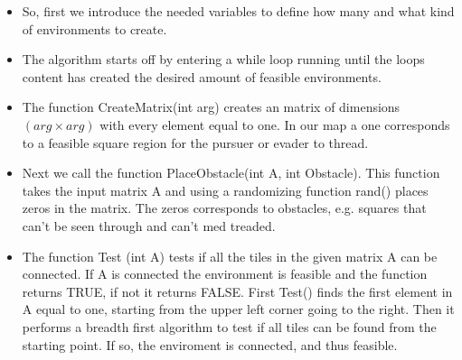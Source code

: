 \begin{itemize}
\item So, first we introduce the needed variables to define how many and what kind of environments to create. 
\item The algorithm starts off by entering a while loop running until the loops content has created the desired amount of feasible environments. 
\item The function CreateMatrix(int arg) creates an matrix of dimensions $(arg \times arg)$ with every element equal to one. In our map a one corresponds to a feasible square region for the pursuer or evader to thread. 
\item Next we call the function PlaceObstacle(int A, int Obstacle). This function takes the input matrix A and using a randomizing function rand() places zeros in the matrix. The zeros corresponds to obstacles, e.g. squares that can't be seen through and can't med treaded.
\item The function Test (int A) tests if all the tiles in the given matrix A can be connected. If A is connected the environment is feasible and the function returns TRUE, if not it returns FALSE. First Test() finds the first element in A equal to one, starting from the upper left corner going to the right. Then it performs a breadth first algorithm to test if all tiles can be found from the starting point. If so, the enviroment is connected, and thus feasible.
\end{itemize}
